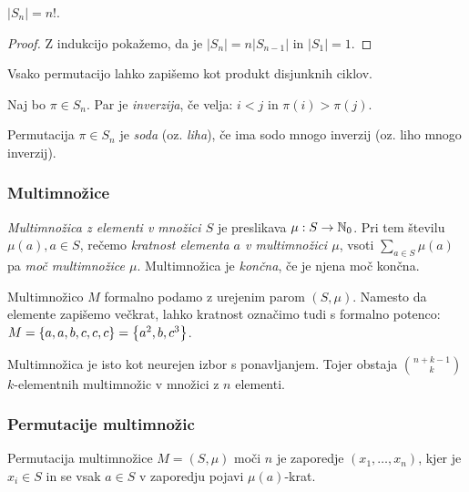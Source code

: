 \begin{trditev}
    $|S_n| = n!$.
\end{trditev}

\begin{proof}
    Z indukcijo pokažemo, da je $|S_n| = n|S_{n-1}|$ in $|S_1| = 1$.
\end{proof}

\begin{trditev}
    Vsako permutacijo lahko zapišemo kot produkt disjunknih ciklov.
\end{trditev}

\begin{definicija}
    Naj bo $\pi \in S_n$. Par je \emph{inverzija}, če velja: $i < j$ in $\pi(i) > \pi(j)$.
\end{definicija}

\begin{definicija}
    Permutacija $\pi \in S_n$ je \emph{soda} (oz. \emph{liha}), če ima sodo mnogo inverzij (oz. liho mnogo inverzij).
\end{definicija}

\subsubsection{Multimnožice}
\begin{definicija}
    \emph{Multimnožica z elementi v množici $S$} je preslikava $\mu: S \to \mathbb{N}_0$. Pri tem številu $\mu(a), a \in S$, rečemo \emph{kratnost elementa $a$ v multimnožici $\mu$}, vsoti $\sum_{a \in S} \mu(a)$ pa \emph{moč multimnožice $\mu$}. Multimnožica je \emph{končna}, če je njena moč končna.
\end{definicija}

\begin{opomba}
    Multimnožico $M$ formalno podamo z urejenim parom $(S, \mu)$. Namesto da elemente zapišemo večkrat, lahko kratnost označimo tudi s formalno potenco: $M = \left\{a, a, b, c, c, c\right\} = \left\{a^2, b, c^3\right\}$.

    Multimnožica je isto kot neurejen izbor s ponavljanjem. Tojer obstaja $\binom{n+k-1}{k}$ $k$-elementnih multimnožic v množici z $n$ elementi.
\end{opomba}

\subsubsection{Permutacije multimnožic}
Permutacija multimnožice $M = (S, \mu)$ moči $n$ je zaporedje $(x_1, \ldots, x_n)$, kjer je $x_i \in S$ in se vsak $a \in S$ v zaporedju pojavi $\mu(a)$-krat.

